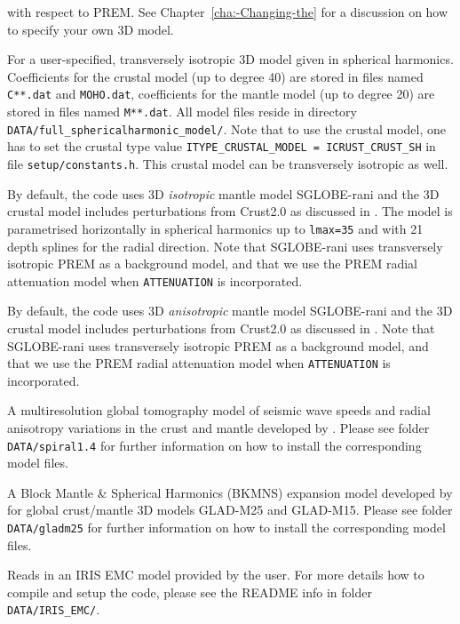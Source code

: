\begin{description}
\begin{description}
with respect to PREM. See Chapter~\ref{cha:-Changing-the}
for a discussion on how to specify your own 3D model.
%
\item [{\texttt{full\_sh}}] For a user-specified, transversely isotropic 3D model given in spherical harmonics. Coefficients for the crustal model (up to degree 40) are stored in files named \texttt{C**.dat} and \texttt{MOHO.dat}, coefficients for the mantle model (up to degree 20) are stored in files named \texttt{M**.dat}.\newline
All model files reside in directory \texttt{DATA/full\_sphericalharmonic\_model/}. Note that to use the crustal model, one has to set the crustal type value \texttt{ITYPE\_CRUSTAL\_MODEL = ICRUST\_CRUST\_SH} in file \texttt{setup/constants.h}. This crustal model can be transversely isotropic as well.
%
\item [{\texttt{sgloberani\_iso}}] By default, the code uses 3D {\it isotropic} mantle model SGLOBE-rani \citep{Chang2015} and the 3D crustal model includes perturbations from Crust2.0 \citep{BaLaMa00} as discussed in \citep{Chang2015}. The model is parametrised horizontally in spherical harmonics up to \texttt{lmax=35} and with 21 depth splines for the radial direction. Note that SGLOBE-rani uses transversely isotropic PREM as a background model, and that we use the PREM radial attenuation model when \texttt{ATTENUATION} is incorporated.
%
\item [{\texttt{sgloberani\_aniso}}] By default, the code uses 3D {\it anisotropic} mantle model SGLOBE-rani \citep{Chang2015} and the 3D crustal model includes perturbations from Crust2.0 \citep{BaLaMa00} as discussed in \citep{Chang2015}. Note that SGLOBE-rani uses transversely isotropic PREM as a background model, and that we use the PREM radial attenuation model when \texttt{ATTENUATION} is incorporated.
%
\item [{\texttt{SPiRaL}}] A multiresolution global tomography model of seismic wave speeds
and radial anisotropy variations in the crust and mantle developed by \citet{Simmons2021}.
Please see folder \texttt{DATA/spiral1.4} for further information on how to install the corresponding model files.
%
\item [{\texttt{GLAD\_bkmns}}] A Block Mantle \& Spherical Harmonics (BKMNS) expansion model developed by \citet{Ciardelli2021}
for global crust/mantle 3D models GLAD-M25 and GLAD-M15.
Please see folder \texttt{DATA/gladm25} for further information on how to install the corresponding model files.
%
\item [{\texttt{EMC\_model}}] Reads in an IRIS EMC model provided by the user. For more details how to compile and setup the code, please see the README info in folder \texttt{DATA/IRIS\_EMC/}.

\end{description}
\end{description}
